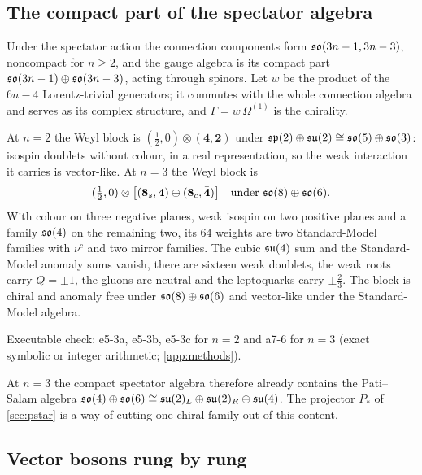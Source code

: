 \subsection{The compact part of the spectator algebra}
\label{sec:spectatorcompact}

Under the spectator action the connection components form $\mathfrak{so}(3n-1,3n-3)$, noncompact for $n\ge2$, and the gauge algebra is its compact part
$\mathfrak{so}(3n-1)\oplus\mathfrak{so}(3n-3)$, acting through spinors. Let $w$ be the product of the $6n-4$ Lorentz-trivial generators; it commutes with the whole
connection algebra and serves as its complex structure, and $\Gamma=w\,\Omega^{(1)}$ is the chirality.

\begin{proposition}
\label{prop:spectator}
At $n=2$ the Weyl block is $(\tfrac12,0)\otimes(\mathbf4,\mathbf2)$ under $\mathfrak{sp}(2)\oplus\mathfrak{su}(2)\cong\mathfrak{so}(5)\oplus\mathfrak{so}(3)$: isospin doublets without colour, in a
real representation, so the weak interaction it carries is vector-like. At $n=3$ the Weyl block is
\[
(\tfrac12,0)\otimes\bigl[(\mathbf8_s,\mathbf4)\oplus(\mathbf8_c,\bar{\mathbf4})\bigr]\quad\text{under }\mathfrak{so}(8)\oplus\mathfrak{so}(6) .
\]
With colour on three negative planes, weak isospin on two positive planes and a family $\mathfrak{so}(4)$ on the remaining two, its $64$ weights are two
Standard-Model families with $\nu^c$ and two mirror families. The cubic $\mathfrak{su}(4)$ sum and the Standard-Model anomaly sums vanish, there are sixteen weak
doublets, the weak roots carry $Q=\pm1$, the gluons are neutral and the leptoquarks carry $\pm\tfrac23$. The block is chiral and anomaly free under
$\mathfrak{so}(8)\oplus\mathfrak{so}(6)$ and vector-like under the Standard-Model algebra.
\end{proposition}

\noindent Executable check: e5-3a, e5-3b, e5-3c for $n=2$ and a7-6 for $n=3$ (exact symbolic or integer arithmetic; \cref{app:methods}).

At $n=3$ the compact spectator algebra therefore already contains the Pati--Salam algebra $\mathfrak{so}(4)\oplus\mathfrak{so}(6)\cong\mathfrak{su}(2)_L\oplus\mathfrak{su}(2)_R\oplus\mathfrak{su}(4)$. The
projector $P_*$ of \cref{sec:pstar} is a way of cutting one chiral family out of this content.

\subsection{Vector bosons rung by rung}
\label{sec:rungs}

